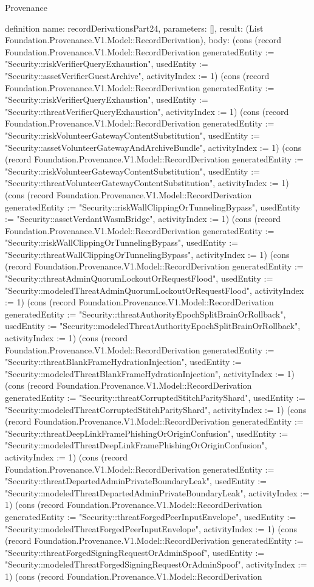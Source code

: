 \begin{lexlean}{Provenance}
\begin{semanticmodule}
definition{
  name: recordDerivationsPart24,
  parameters: [],
  result: (List Foundation.Provenance.V1.Model::RecordDerivation),
  body: (cons (record Foundation.Provenance.V1.Model::RecordDerivation {generatedEntity := "Security::riskVerifierQueryExhaustion", usedEntity := "Security::assetVerifierGuestArchive", activityIndex := 1}) (cons (record Foundation.Provenance.V1.Model::RecordDerivation {generatedEntity := "Security::riskVerifierQueryExhaustion", usedEntity := "Security::threatVerifierQueryExhaustion", activityIndex := 1}) (cons (record Foundation.Provenance.V1.Model::RecordDerivation {generatedEntity := "Security::riskVolunteerGatewayContentSubstitution", usedEntity := "Security::assetVolunteerGatewayAndArchiveBundle", activityIndex := 1}) (cons (record Foundation.Provenance.V1.Model::RecordDerivation {generatedEntity := "Security::riskVolunteerGatewayContentSubstitution", usedEntity := "Security::threatVolunteerGatewayContentSubstitution", activityIndex := 1}) (cons (record Foundation.Provenance.V1.Model::RecordDerivation {generatedEntity := "Security::riskWallClippingOrTunnelingBypass", usedEntity := "Security::assetVerdantWasmBridge", activityIndex := 1}) (cons (record Foundation.Provenance.V1.Model::RecordDerivation {generatedEntity := "Security::riskWallClippingOrTunnelingBypass", usedEntity := "Security::threatWallClippingOrTunnelingBypass", activityIndex := 1}) (cons (record Foundation.Provenance.V1.Model::RecordDerivation {generatedEntity := "Security::threatAdminQuorumLockoutOrRequestFlood", usedEntity := "Security::modeledThreatAdminQuorumLockoutOrRequestFlood", activityIndex := 1}) (cons (record Foundation.Provenance.V1.Model::RecordDerivation {generatedEntity := "Security::threatAuthorityEpochSplitBrainOrRollback", usedEntity := "Security::modeledThreatAuthorityEpochSplitBrainOrRollback", activityIndex := 1}) (cons (record Foundation.Provenance.V1.Model::RecordDerivation {generatedEntity := "Security::threatBlankFrameHydrationInjection", usedEntity := "Security::modeledThreatBlankFrameHydrationInjection", activityIndex := 1}) (cons (record Foundation.Provenance.V1.Model::RecordDerivation {generatedEntity := "Security::threatCorruptedStitchParityShard", usedEntity := "Security::modeledThreatCorruptedStitchParityShard", activityIndex := 1}) (cons (record Foundation.Provenance.V1.Model::RecordDerivation {generatedEntity := "Security::threatDeepLinkFramePhishingOrOriginConfusion", usedEntity := "Security::modeledThreatDeepLinkFramePhishingOrOriginConfusion", activityIndex := 1}) (cons (record Foundation.Provenance.V1.Model::RecordDerivation {generatedEntity := "Security::threatDepartedAdminPrivateBoundaryLeak", usedEntity := "Security::modeledThreatDepartedAdminPrivateBoundaryLeak", activityIndex := 1}) (cons (record Foundation.Provenance.V1.Model::RecordDerivation {generatedEntity := "Security::threatForgedPeerInputEnvelope", usedEntity := "Security::modeledThreatForgedPeerInputEnvelope", activityIndex := 1}) (cons (record Foundation.Provenance.V1.Model::RecordDerivation {generatedEntity := "Security::threatForgedSigningRequestOrAdminSpoof", usedEntity := "Security::modeledThreatForgedSigningRequestOrAdminSpoof", activityIndex := 1}) (cons (record Foundation.Provenance.V1.Model::RecordDerivation }
\end{semanticmodule}
\end{lexlean}
